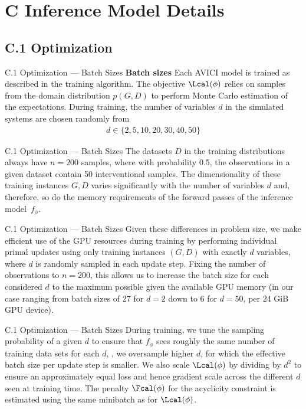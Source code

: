 \documentclass[aspectratio=169,10pt]{beamer}
\newcommand{\ours}{AVICI\xspace}
\begin{document}
\section{C Inference Model Details}
\subsection{C.1 Optimization}

\begin{frame}{C.1 Optimization --- Batch Sizes}
\textbf{Batch sizes}\quad
Each \ours model is trained as described in the training algorithm. The objective $\Lcal(\phi)$ relies on samples from the domain distribution $p(G, D)$ to perform Monte Carlo estimation of the expectations. During training, the number of variables $d$ in the simulated systems are chosen randomly from
\begin{align*}
    d \in \{2, 5, 10, 20, 30, 40, 50 \}
\end{align*}
\end{frame}

\begin{frame}{C.1 Optimization --- Batch Sizes}
The datasets $D$ in the training distributions always have $n=200$ samples, where with probability \num{0.5}, the observations in a given dataset contain \num{50} interventional samples. The dimensionality of these training instances $G, D$ varies significantly with the number of variables $d$ and, therefore, so do the memory requirements of the forward passes of the inference model~$f_\phi$.
\end{frame}

\begin{frame}{C.1 Optimization --- Batch Sizes}
\small
Given these differences in problem size, we make efficient use of the GPU resources during training by performing individual primal updates using only training instances $(G, D)$ with exactly $d$ variables, where $d$ is randomly sampled in each update step. Fixing the number of observations to $n=200$, this allows us to increase the batch size for each considered $d$ to the maximum possible given the available GPU memory (in our case ranging from batch sizes of \num{27} for $d=2$ down to \num{6} for $d=50$, per \num{24} GiB GPU device).
\end{frame}

\begin{frame}{C.1 Optimization --- Batch Sizes}
During training, we tune the sampling probability of a given $d$ to ensure that $f_\phi$ sees roughly the same number of training data sets for each $d$, \ie, we oversample higher $d$, for which the effective batch size per update step is smaller. We also scale $\Lcal(\phi)$ by dividing by $d^2$ to ensure an approximately equal loss and hence gradient scale across the different $d$ seen at training time. The penalty $\Fcal(\phi)$ for the acyclicity constraint is estimated using the same minibatch as for $\Lcal(\phi)$.
\end{frame}
\end{document}
